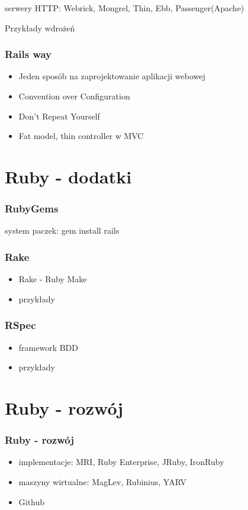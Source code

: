 \documentclass[12t]{beamer}
\begin{document}
\begin{frame}
  serwery HTTP: Webrick, Mongrel, Thin, Ebb, Passenger(Apache)
\end{frame}

\begin{frame}
  Przykłady wdrożeń
\end{frame}

\begin{frame}
  \frametitle{Rails way}
  \begin{itemize}
  \item Jeden sposób na zaprojektowanie aplikacji webowej
  \item Convention over Configuration
  \item Don't Repeat Yourself
  \item Fat model, thin controller w MVC
  \end{itemize}
\end{frame}

\section{Ruby - dodatki}
\begin{frame}
  \frametitle{RubyGems}
  system paczek: gem install rails
\end{frame}

\begin{frame}
  \frametitle{Rake}
  \begin{itemize}
  \item Rake - Ruby Make
  \item przykłady
  \end{itemize}
\end{frame}

\begin{frame}
  \frametitle{RSpec}
  \begin{itemize}
  \item framework BDD
  \item przykłady
  \end{itemize}
\end{frame}

\section{Ruby - rozwój}
\begin{frame}
  \frametitle{Ruby - rozwój}
  \begin{itemize}
  \item implementacje: MRI, Ruby Enterprise, JRuby, IronRuby
  \item maszyny wirtualne: MagLev, Rubinius, YARV
  \item Github
  \end{itemize}
\end{frame}
\end{document}
